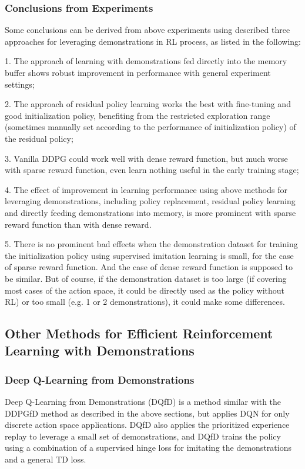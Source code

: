 \documentclass{article}
\begin{document}
\subsubsection{Conclusions from Experiments}

Some conclusions can be derived from above experiments using described three approaches for leveraging demonstrations in RL process, as listed in the following:

1. The approach of learning with demonstrations fed directly into the memory buffer shows robust improvement in performance with general experiment settings;

2. The approach of residual policy learning works the best with fine-tuning and good initialization policy, benefiting from the restricted exploration range (sometimes manually set according to the performance of initialization policy) of the residual policy;

3. Vanilla DDPG could work well with dense reward function, but much worse with sparse reward function, even learn nothing useful in the early training stage;

4. The effect of improvement in learning performance using above methods for leveraging demonstrations, including policy replacement, residual policy learning and directly feeding demonstrations into memory, is more prominent with sparse reward function than with dense reward.

5. There is no prominent bad effects when the demonstration dataset for training the initialization policy using supervised imitation learning is small, for the case of sparse reward function. And the case of dense reward function is supposed to be similar. But of course, if the demonstration dataset is too large (if covering most cases of the action space, it could be directly used as the policy without RL) or too small (e.g. 1 or 2 demonstrations), it could make some differences.

\subsection{Other Methods for Efficient Reinforcement Learning with Demonstrations}

\subsubsection{Deep Q-Learning from Demonstrations}
Deep Q-Learning from Demonstrations (DQfD) \cite{hester2018deep} is a method similar with the DDPGfD method as described in the above sections, but applies DQN for only discrete action space applications. DQfD also applies the prioritized experience replay to leverage a small set of demonstrations, and DQfD trains the policy using a combination of a supervised hinge loss for imitating the demonstrations and a general TD loss.
\end{document}

